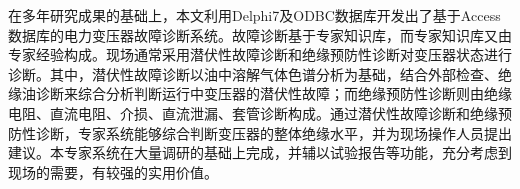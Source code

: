 \documentclass{suepthesis}
\begin{document}
\makecover
\makepromise
\makeauthorize

在多年研究成果的基础上，本文利用Delphi7及ODBC数据库开发出了基于Access数据库的电力变压器故障诊断系统。故障诊断基于专家知识库，而专家知识库又由专家经验构成。现场通常采用潜伏性故障诊断和绝缘预防性诊断对变压器状态进行诊断。其中，潜伏性故障诊断以油中溶解气体色谱分析为基础，结合外部检查、绝缘油诊断来综合分析判断运行中变压器的潜伏性故障；而绝缘预防性诊断则由绝缘电阻、直流电阻、介损、直流泄漏、套管诊断构成。通过潜伏性故障诊断和绝缘预防性诊断，专家系统能够综合判断变压器的整体绝缘水平，并为现场操作人员提出建议。本专家系统在大量调研的基础上完成，并辅以试验报告等功能，充分考虑到现场的需要，有较强的实用价值。
\end{document}
